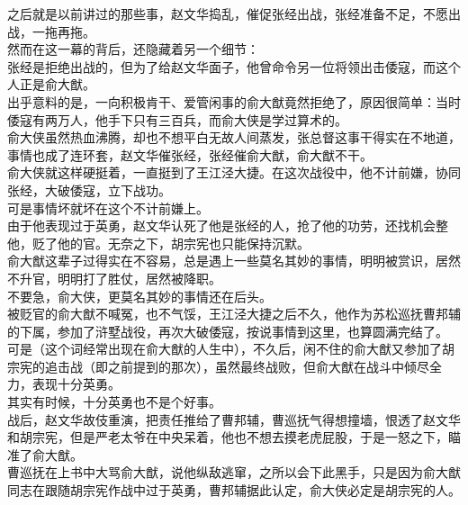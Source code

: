 \begin{multicols}{\theparacolNo}
之后就是以前讲过的那些事，赵文华捣乱，催促张经出战，张经准备不足，不愿出战，一拖再拖。\\

然而在这一幕的背后，还隐藏着另一个细节：\\

张经是拒绝出战的，但为了给赵文华面子，他曾命令另一位将领出击倭寇，而这个人正是俞大猷。\\

出乎意料的是，一向积极肯干、爱管闲事的俞大猷竟然拒绝了，原因很简单：当时倭寇有两万人，他手下只有三百兵，而俞大侠是学过算术的。\\

俞大侠虽然热血沸腾，却也不想平白无故人间蒸发，张总督这事干得实在不地道，事情也成了连环套，赵文华催张经，张经催俞大猷，俞大猷不干。\\

俞大侠就这样硬挺着，一直挺到了王江泾大捷。在这次战役中，他不计前嫌，协同张经，大破倭寇，立下战功。\\

可是事情坏就坏在这个不计前嫌上。\\

由于他表现过于英勇，赵文华认死了他是张经的人，抢了他的功劳，还找机会整他，贬了他的官。无奈之下，胡宗宪也只能保持沉默。\\

俞大猷这辈子过得实在不容易，总是遇上一些莫名其妙的事情，明明被赏识，居然不升官，明明打了胜仗，居然被降职。\\

不要急，俞大侠，更莫名其妙的事情还在后头。\\

被贬官的俞大猷不喊冤，也不气馁，王江泾大捷之后不久，他作为苏松巡抚曹邦辅的下属，参加了浒墅战役，再次大破倭寇，按说事情到这里，也算圆满完结了。\\

可是（这个词经常出现在俞大猷的人生中），不久后，闲不住的俞大猷又参加了胡宗宪的追击战（即之前提到的那次），虽然最终战败，但俞大猷在战斗中倾尽全力，表现十分英勇。\\

其实有时候，十分英勇也不是个好事。\\

战后，赵文华故伎重演，把责任推给了曹邦辅，曹巡抚气得想撞墙，恨透了赵文华和胡宗宪，但是严老太爷在中央呆着，他也不想去摸老虎屁股，于是一怒之下，瞄准了俞大猷。\\

曹巡抚在上书中大骂俞大猷，说他纵敌逃窜，之所以会下此黑手，只是因为俞大猷同志在跟随胡宗宪作战中过于英勇，曹邦辅据此认定，俞大侠必定是胡宗宪的人。\\


\end{multicols}
